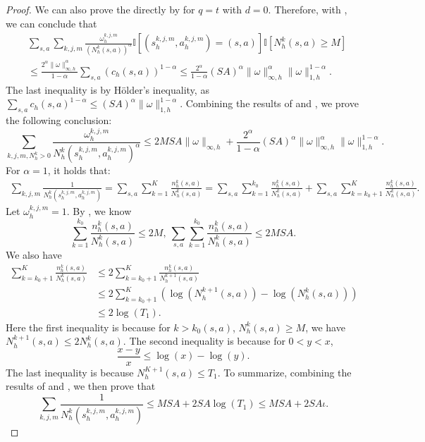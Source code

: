 \documentclass{article}
\begin{document}
\begin{proof}
We can also prove the  directly by  for $q =t$ with $d = 0$. Therefore, with , we can conclude that
\begin{align}
    \label{split2}
    &\sum_{s,a}\sum_{k, j, m}\frac{\omega_{h}^{k, j, m}}{(N_h^k(s,a))^{\alpha}}\mathbb{I}[(s_h^{k,j,m},a_h^{k,j,m}) = (s,a)] \mathbb{I}\left[ N_h^k(s,a)\geq M\right] \nonumber\\&\leq \frac{2^\alpha\|\omega\|_{\infty,h}^\alpha}{1-\alpha}\sum_{s,a}(c_h(s,a))^{1-\alpha}   \leq \frac{2^\alpha}{1-\alpha}(SA)^{\alpha}\|\omega\|_{\infty,h}^\alpha \|\omega\|_{1,h}^{1-\alpha}.
\end{align}
The last inequality is by Hölder's inequality, as $\sum_{s,a}c_h(s,a)^{1-\alpha} \leq (SA)^{\alpha}\|\omega\|_{1,h}^{1-\alpha}$.
Combining the results of  and , we prove the following conclusion:
$$\sum_{k,j,m,N_h^k > 0}\frac{\omega_{h}^{k, j, m}}{N_h^k(s_h^{k,j,m},a_h^{k,j,m})^{\alpha}} \leq 2MSA\|\omega\|_{\infty,h}+\frac{2^\alpha}{1-\alpha}(SA)^{\alpha}\|\omega\|_{\infty,h}^\alpha \|\omega\|_{1,h}^{1-\alpha}.$$
For $\alpha = 1$, it holds that:
\begin{align*}
    \sum_{k,j,m}\frac{1}{N_h^k(s_h^{k,j,m},a_h^{k,j,m})}= \sum_{s,a}\sum_{k=1}^{K}\frac{n_h^k(s,a)}{N_h^k(s,a)} = \sum_{s,a}\sum_{k=1}^{k_0}\frac{n_h^k(s,a)}{N_h^k(s,a)}+\sum_{s,a}\sum_{k=k_0+1}^{K}\frac{n_h^k(s,a)}{N_h^k(s,a)}.
\end{align*}
Let $\omega_{h}^{k,j,m} = 1$. By , we know 
\begin{equation}
\label{smallN1}
    \sum_{k=1}^{k_0}\frac{n_h^k(s,a)}{N_h^k(s,a)} \leq 2M,\ \sum_{s,a}\sum_{k=1}^{k_0}\frac{n_h^k(s,a)}{N_h^k(s,a)} \leq 2MSA.
\end{equation}
We also have
\begin{align}
\label{largeN1}
    \sum_{k=k_0+1}^{K}\frac{n_h^k(s,a)}{N_h^k(s,a)} &\leq 2\sum_{k=k_0+1}^{K}\frac{n_h^k(s,a)}{N_h^{k+1}(s,a)} \nonumber\\
    &\leq 2\sum_{k=k_0+1}^{K} \left(\log(N_h^{k+1}(s,a))-\log(N_h^{k}(s,a))\right) \nonumber\\
    &\leq 2\log(T_1).
\end{align}
Here the first inequality is because for $k > k_0(s,a)$, $N_h^k(s,a) \geq M$, we have $N_h^{k+1}(s,a) \leq 2N_h^k(s,a)$. The second inequality is because for $0 < y < x$,
$$\frac{x-y}{x} \leq \log(x) - \log(y).$$
The last inequality is because $N_h^{K+1}(s,a) \leq T_1$.
To summarize, combining the results of  and , we then prove that
$$\sum_{k,j,m}\frac{1}{N_h^k(s_h^{k,j,m},a_h^{k,j,m})} \leq MSA + 2SA\log(T_1) \leq MSA + 2SA\iota.$$
\end{proof}
\end{document}
